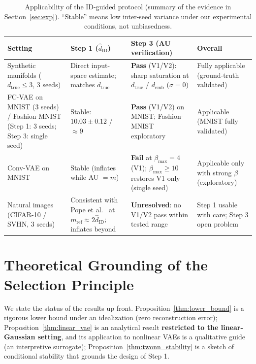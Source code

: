\documentclass[make,article,submit,pdftex,moreauthors]{Definitions/mdpi}
\newcommand{\hatdID}{\hat{d}_{\mathrm{ID}}}
\newcommand{\dtrue}{d_{\mathrm{true}}}
\newcommand{\demb}{d_{\mathrm{emb}}}
\begin{document}
\begin{table}[H]
\caption{Applicability of the ID-guided protocol (summary of the evidence in
Section~\ref{sec:exp}). ``Stable'' means low inter-seed variance under our
experimental conditions, not unbiasedness.}
\label{tab:applicability}
\small
\begin{tabular}{p{2.6cm}p{2.9cm}p{3.1cm}p{3.6cm}}
\toprule
\textbf{Setting} & \textbf{Step 1 ($\hatdID$)} & \textbf{Step 3 (AU verification)} & \textbf{Overall} \\
\midrule
Synthetic manifolds ($\dtrue \leq 3$, 3 seeds) & Direct input-space estimate; matches $\dtrue$ & \textbf{Pass} (V1/V2): sharp saturation at $\dtrue$ / $\demb$ ($\sigma = 0$) & Fully applicable (ground-truth validated) \\
\addlinespace
FC-VAE on MNIST (3 seeds) / Fashion-MNIST (Step 1: 3 seeds; Step 3: single seed) & Stable: $10.03 \pm 0.12$ / $\approx 9$ & \textbf{Pass} (V1/V2) on MNIST; Fashion-MNIST exploratory & Applicable (MNIST fully validated) \\
\addlinespace
Conv-VAE on MNIST & Stable (inflates while AU $= m$) & \textbf{Fail} at $\beta_{\max} = 4$ (V1); $\beta_{\max} \geq 10$ restores V1 only (single seed) & Applicable only with strong $\beta$ (exploratory) \\
\addlinespace
Natural images (CIFAR-10 / SVHN, 3 seeds) & Consistent with Pope et al.~\cite{pope2021intrinsic} at $m_{\mathrm{ref}} \approx 2\hatdID$; inflates beyond & \textbf{Unresolved}: no V1/V2 pass within tested range & Step 1 usable with care; Step 3 open problem \\
\bottomrule
\end{tabular}
\end{table}

\section{Theoretical Grounding of the Selection Principle}\label{sec:theory}

We state the status of the results up front.
Proposition~\ref{thm:lower_bound} is a rigorous lower bound under an
idealization (zero reconstruction error);
Proposition~\ref{thm:linear_vae} is an analytical result
\textbf{restricted to the linear-Gaussian setting}, and its application to
nonlinear VAEs is a qualitative guide (an interpretive surrogate);
Proposition~\ref{thm:twonn_stability} is a sketch of conditional stability
that grounds the design of Step 1.
\end{document}
